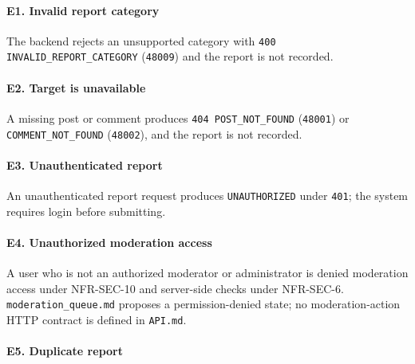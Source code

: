 \documentclass[12pt]{article}
\begin{document}
\hypertarget{sec:e1-invalid-report-category}{}
\paragraph*{E1. Invalid report category}
\par\medskip

The backend rejects an unsupported category with \texttt{400 INVALID\_REPORT\_CATEGORY} (\texttt{48009}) and the report is not recorded.
\par\medskip

\hypertarget{sec:e2-target-is-unavailable}{}
\paragraph*{E2. Target is unavailable}
\par\medskip

A missing post or comment produces \texttt{404 POST\_NOT\_FOUND} (\texttt{48001}) or \texttt{COMMENT\_NOT\_FOUND} (\texttt{48002}), and the report is not recorded.
\par\medskip

\hypertarget{sec:e3-unauthenticated-report}{}
\paragraph*{E3. Unauthenticated report}
\par\medskip

An unauthenticated report request produces \texttt{UNAUTHORIZED} under \texttt{401}; the system requires login before submitting.
\par\medskip

\hypertarget{sec:e4-unauthorized-moderation-access}{}
\paragraph*{E4. Unauthorized moderation access}
\par\medskip

A user who is not an authorized moderator or administrator is denied moderation access under NFR-SEC-10 and server-side checks under NFR-SEC-6. \texttt{moderation\_queue.md} proposes a permission-denied state; no moderation-action HTTP contract is defined in \texttt{API.md}.
\par\medskip

\hypertarget{sec:e5-duplicate-report}{}
\paragraph*{E5. Duplicate report}
\par\medskip
\end{document}
